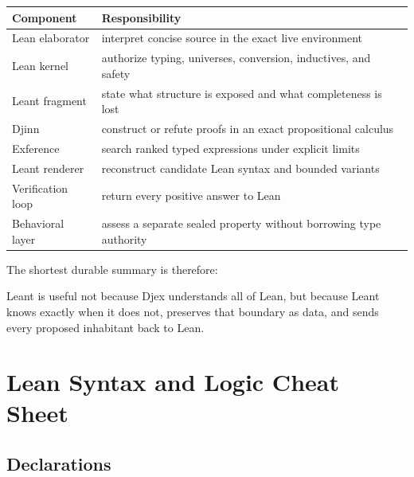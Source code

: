 \documentclass[10pt,letterpaper,oneside,openany]{report}
\begin{document}
\begin{center}
\begin{tabularx}{0.92\textwidth}{@{}l X@{}}
\toprule
Component & Responsibility \\
\midrule
Lean elaborator & interpret concise source in the exact live environment \\
Lean kernel & authorize typing, universes, conversion, inductives, and safety \\
Leant fragment & state what structure is exposed and what completeness is lost \\
Djinn & construct or refute proofs in an exact propositional calculus \\
Exference & search ranked typed expressions under explicit limits \\
Leant renderer & reconstruct candidate Lean syntax and bounded variants \\
Verification loop & return every positive answer to Lean \\
Behavioral layer & assess a separate sealed property without borrowing type authority \\
\bottomrule
\end{tabularx}
\end{center}

The shortest durable summary is therefore:

\begin{keyidea}
Leant is useful not because Djex understands all of Lean, but because Leant knows exactly when it does not, preserves that boundary as data, and sends every proposed inhabitant back to Lean.
\end{keyidea}

\appendix

\chapter{Lean Syntax and Logic Cheat Sheet}\label{app:syntax}

\section{Declarations}
\end{document}
